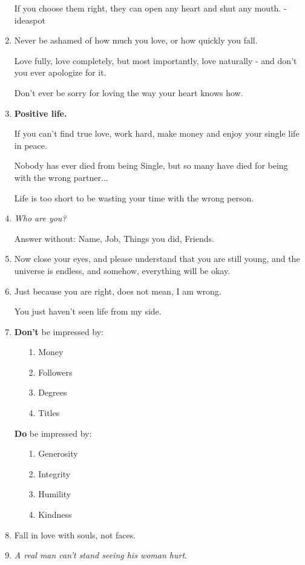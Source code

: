 \documentclass{article}
\numberwithin{equation}{section}
\begin{document}
\begin{enumerate}
    If you choose them right, they can open any heart and shut any mouth. - ideaspot
    \item Never be ashamed of how much you love, or how quickly you fall.
    
    Love fully, love completely, but most importantly, love naturally - and don't you ever apologize for it.
    
    Don't ever be sorry for loving the way your heart knows how.
    \item \textbf{Positive life.}
    
    If you can't find true love, work hard, make money and enjoy your single life in peace.
    
    Nobody has ever died from being Single, but so many have died for being with the wrong partner$\ldots$
    
    Life is too short to be wasting your time with the wrong person.
    \item \textit{Who are you?}
    
    Answer without: Name, Job, Things you did, Friends.
    \item Now close your eyes, and please understand that you are still young, and the universe is endless, and somehow, everything will be okay.
    \item Just because you are right, does not mean, I am wrong.
    
    You just haven't seen life from my side.
    \item \textbf{Don't} be impressed by:
    \begin{itemize}
        \item[1.] Money
        \item[2.] Followers
        \item[3.] Degrees
        \item[4.] Titles
    \end{itemize}
    \textbf{Do} be impressed by:
    \begin{itemize}
        \item[1.] Generosity
        \item[2.] Integrity
        \item[3.] Humility
        \item[4.] Kindness
    \end{itemize}
    \item Fall in love with souls, not faces.
    \item \textit{A real man can't stand seeing his woman hurt}.
    

\end{enumerate}
\end{document}
